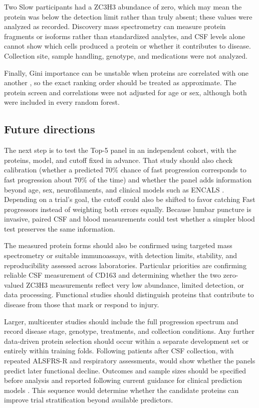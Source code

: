 \documentclass[11pt,letterpaper]{article}
\begin{document}
Two Slow participants had a ZC3H3 abundance of zero, which may mean the protein was below the detection limit rather than truly absent; these values were analyzed as recorded. Discovery mass spectrometry can measure protein fragments or isoforms rather than standardized analytes, and CSF levels alone cannot show which cells produced a protein or whether it contributes to disease. Collection site, sample handling, genotype, and medications were not analyzed.

Finally, Gini importance can be unstable when proteins are correlated with one another \citep{strobl2007}, so the exact ranking order should be treated as approximate. The protein screen and correlations were not adjusted for age or sex, although both were included in every random forest.

\subsection{Future directions}

The next step is to test the Top-5 panel in an independent cohort, with the proteins, model, and cutoff fixed in advance. That study should also check calibration (whether a predicted 70\% chance of fast progression corresponds to fast progression about 70\% of the time) and whether the panel adds information beyond age, sex, neurofilaments, and clinical models such as ENCALS \citep{westeneng2018,benatar2020}. Depending on a trial's goal, the cutoff could also be shifted to favor catching Fast progressors instead of weighting both errors equally. Because lumbar puncture is invasive, paired CSF and blood measurements could test whether a simpler blood test preserves the same information.

The measured protein forms should also be confirmed using targeted mass spectrometry or suitable immunoassays, with detection limits, stability, and reproducibility assessed across laboratories. Particular priorities are confirming reliable CSF measurement of CD163 and determining whether the two zero-valued ZC3H3 measurements reflect very low abundance, limited detection, or data processing. Functional studies should distinguish proteins that contribute to disease from those that mark or respond to injury.

Larger, multicenter studies should include the full progression spectrum and record disease stage, genotype, treatments, and collection conditions. Any further data-driven protein selection should occur within a separate development set or entirely within training folds. Following patients after CSF collection, with repeated ALSFRS-R and respiratory assessments, would show whether the panels predict later functional decline. Outcomes and sample sizes should be specified before analysis and reported following current guidance for clinical prediction models \citep{collins2024}. This sequence would determine whether the candidate proteins can improve trial stratification beyond available predictors.
\end{document}
